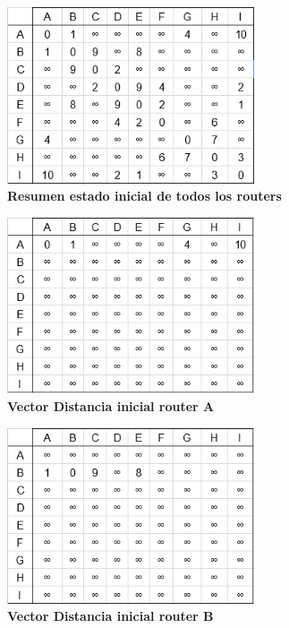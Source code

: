 \documentclass[12pt]{article}
\begin{document}
\begin{figure}[H] 
\centering 
\includegraphics[width=0.65\textwidth]{imagenes/2inicial.png} \caption{\small \textbf{Resumen estado inicial de todos los routers}}
\label{fig:diagrama_7} 
\end{figure}

\begin{figure}[H] 
\centering 
\includegraphics[width=0.65\textwidth]{imagenes/2inicialA.png} \caption{\small \textbf{Vector Distancia inicial router A}}
\label{fig:diagrama_8} 
\end{figure}

\begin{figure}[H] 
\centering 
\includegraphics[width=0.65\textwidth]{imagenes/2inicialB.png} \caption{\small \textbf{Vector Distancia inicial router B}}
\label{fig:diagrama_9} 
\end{figure}
\end{document}
